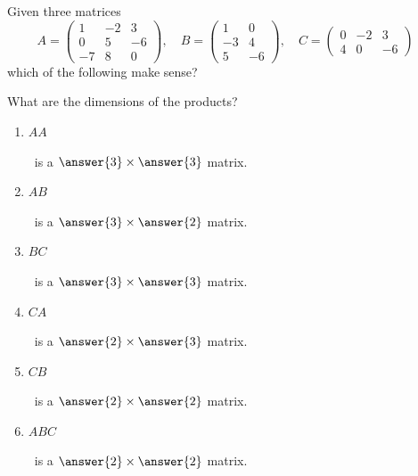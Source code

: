 \documentclass{ximera}
\begin{document}
\begin{question}
  Given three matrices
  \[
    A =\begin{pmatrix}
      1 & -2 & 3 \\
      0 & 5 & -6 \\
      -7 & 8 & 0
    \end{pmatrix},\quad B =\begin{pmatrix}
      1 & 0 \\
      -3 & 4 \\
      5 & -6
    \end{pmatrix}, \quad C =\begin{pmatrix}
      0 & -2 & 3 \\
      4 & 0 & -6
    \end{pmatrix}\quad
  \]
  which of the following make sense?
  \begin{selectAll}
      \pdfOnly{\end{multicols}}
  \end{selectAll}
  \begin{question}
    What are the dimensions of the products?
      \begin{enumerate}
      \item $AA$\begin{prompt}~is a $\answer{3}\times\answer{3}$ matrix.\end{prompt}
      \item $AB$\begin{prompt}~is a $\answer{3}\times\answer{2}$ matrix.\end{prompt}
      \item $BC$\begin{prompt}~is a $\answer{3}\times\answer{3}$ matrix.\end{prompt}
      \item $CA$\begin{prompt}~is a $\answer{2}\times\answer{3}$ matrix.\end{prompt}
      \item $CB$\begin{prompt}~is a $\answer{2}\times\answer{2}$ matrix.\end{prompt}
      \item $ABC$\begin{prompt}~is a $\answer{2}\times\answer{2}$ matrix.\end{prompt}
      \end{enumerate}
      \pdfOnly{\end{multicols}}
  \end{question}
\end{question}
\end{document}
